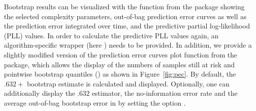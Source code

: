 \documentclass[]{jss}
\begin{document}
\begin{Schunk}
\end{Schunk}

Bootstrap results can be visualized with the  function from the  package showing the selected complexity parameters, 
out-of-bag prediction error curves as well as the prediction error integrated over time, and the predictive partial log-likelihood (PLL) values. In order to calculate the predictive PLL values again, an algorithm-specific wrapper (here ) needs to be provided. In addition, we provide a slightly modified version of the prediction error curves plot function from the  package, which allows the display of the numbers of samples still at risk and pointwise bootstrap quantiles () as shown in Figure~\ref{fig:pec}. By default, the $.632+$ bootstrap estimate is calculated and displayed. Optionally, one can additionally display the $.632$ estimator, the no-information error rate and the average out-of-bag bootstrap error in  by setting the option . \\
\end{document}
